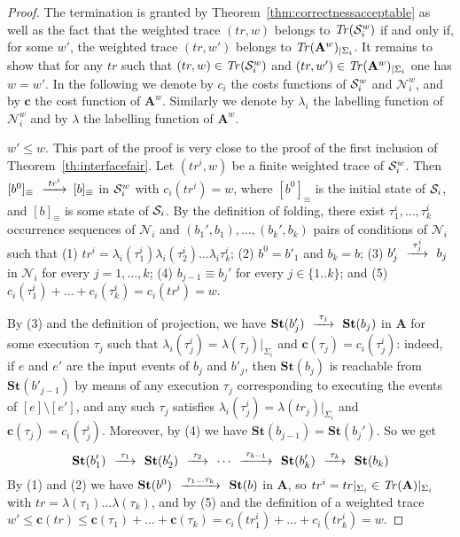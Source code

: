 \documentclass{llncs}
\def\prod{\mathbf{A}}
\def\N{\mathcal{N}}
\def\S{\mathcal{S}}
\newcommand{\st}[1]{\mathbf{St}(#1)}
\newcommand{\Tr}[1]{{\it Tr}(#1)}
\renewcommand{\S}{{\cal S}}
\def\trace{tr}
\def\by#1{\mathop{{\hbox{\setbox0=\hbox{$\scriptstyle{#1\quad}$}{$\buildrel{\quad\scriptstyle{#1}\quad}\over{\hbox to \wd0{\rightarrowfill}}$}}}}}
\begin{document}
\begin{proof}
The termination is granted by Theorem~\ref{thm:correctnessacceptable} as well as the fact that the weighted trace $(\trace,w)$ belongs to $\Tr{\S^w_i}$ if and only if, for some $w'$, the weighted trace $(\trace,w')$ belongs to $\Tr{\prod^w}_{|\Sigma_i}$.
It remains to show that for any $\trace$ such that $(\trace,w)\in\Tr{\S^w_i}$ and $(\trace,w')\in\Tr{\prod^w}_{|\Sigma_i}$ one has $w=w'$.
In the following we denote by $c_i$ the costs functions of $\S^w_i$ and $\N^w_i$, and by $\mathbf{c}$ the cost function of $\prod^w$.
Similarly we denote by $\lambda_i$ the labelling function of $\N^w_i$ and by $\lambda$ the labelling function of $\prod^w$.

$w'\leq w$.
This part of the proof is very close to the proof of the first inclusion of Theorem~\ref{th:interfacefair}.
Let $(\trace^i,w)$ be a finite weighted trace of $\S_i^w$. 
Then $[b^0]_\equiv \by{\trace^i} [b]_\equiv$ in $\S_i^w$ with $c_i(\trace^i)=w$,
where $[b^0]_\equiv$ is the initial state of $\S_i$, and $[b]_\equiv$ is some state of $\S_i$.
By the definition of folding, there exist $\tau^i_{1}, \ldots, \tau^i_{k}$ occurrence sequences of $\N_i$ and $(b_1',b_1), \ldots, (b_k',b_k)$ pairs of conditions of $\N_i$ such that
(1) $\trace^i = \lambda_i(\tau^i_{1}) \lambda_i(\tau^i_{2}) \ldots \lambda_i\tau^i_{k}$; (2) $b^0=b'_1$ and $b_k=b$; (3) $b_{j}' \by{\tau_{j}^i} b_j$ in $\N_i$ for every $j=1,\ldots, k$; 
(4) $b_{j-1} \equiv  b_j'$ for every $j\in\{1..k\}$;
and (5) $c_i(\tau^i_1) + \dots + c_i(\tau^i_k)=c_i(\trace^i)=w$.

By (3) and the definition of projection, we have
$\st{b_{j}'} \by{\tau_{j}} \st{b_j}$ in $\prod$ for some execution $\tau_j$ such that $\lambda_i(\tau^i_{j})=\lambda(\tau_j)|_{\Sigma_i}$ and $\mathbf{c}(\tau_j)= c_i(\tau_j^i)$: indeed, if $e$ and $e'$ are the input events of $b_j$ and $b'_{j}$, then $\st{b_j}$ is reachable from $\st{b'_{j-1}}$ by means of any execution $\tau_j$ corresponding to executing the events of $[e] \setminus [e']$, and any
such $\tau_j$ satisfies $\lambda_i(\tau^i_{j})=\lambda(\trace_j)|_{\Sigma_i}$ and $\mathbf{c}(\tau_j)= c_i(\tau_j^i)$. Moreover, by (4) we have $\st{b_{j-1}}=\st{b_j'}$. So we get 
$$\st{b_1'} \by{\tau_{1}} \st{b_2'} \by{\tau_{2}} \cdots \by{\tau_{k-1}}\st{b_{k}'} \by{\tau_{k}} \st{b_k}$$
\noindent By (1) and (2) we have $\st{b^0}\by{\tau_1 \ldots \tau_k} \st{b}$ in $\prod$, so
$\trace^i=\trace|_{\Sigma_i}\in\Tr{\prod}|_{\Sigma_i}$ with $\trace=\lambda(\tau_1)\ldots\lambda(\tau_k)$, and by (5) and the definition of a weighted trace $w'\leq \mathbf{c}(\trace)\leq \mathbf{c}(\tau_1)+\dots+\mathbf{c}(\tau_k)= c_i(\trace_1^i)+\dots+c_i(\trace_k^i)=w$.


\end{proof}
\end{document}
